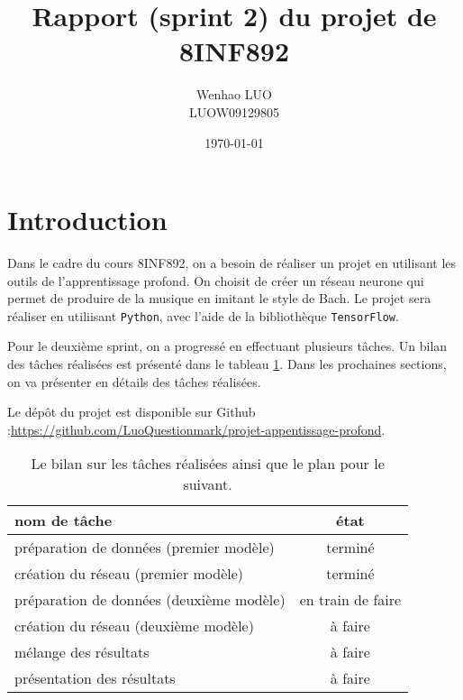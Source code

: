 \documentclass{article}
\title{Rapport (sprint 2) du projet de 8INF892}
\author{Wenhao LUO\\LUOW09129805}
\date{\today}
\begin{document}
\maketitle

\newpage
\section{Introduction}

\par Dans le cadre du cours 8INF892, on a besoin de réaliser un projet en utilisant les outils de l'apprentissage profond. On choisit de créer un réseau neurone qui permet de produire de la musique en imitant le style de Bach. Le projet sera réaliser en utiliisant \texttt{Python}, avec l'aide de la bibliothèque \texttt{TensorFlow}.

\par Pour le deuxième sprint, on a progressé en effectuant plusieurs tâches. Un bilan des tâches réalisées est présenté dans le tableau \ref{tab:bilan}. Dans les prochaines sections, on va présenter en détails des tâches réalisées.

\par Le dépôt du projet est disponible sur Github :\newline \url{https://github.com/LuoQuestionmark/projet-appentissage-profond}.

\begin{table}[htb]
    \centering
    \begin{tabular}{|l|c|}
        \hline
        nom de tâche & état \\
        \hline
        \hline
        préparation de données (premier modèle) & terminé \\
        \hline
        création du réseau (premier modèle) & terminé \\
        \hline
        préparation de données (deuxième modèle) & en train de faire \\
        \hline
        création du réseau (deuxième modèle) & à faire \\
        \hline
        mélange des résultats & à faire \\
        \hline
        présentation des résultats & à faire \\
        \hline
    \end{tabular}
    \caption{Le bilan sur les tâches réalisées ainsi que le plan pour le suivant.}
    \label{tab:bilan}
\end{table}
\end{document}
